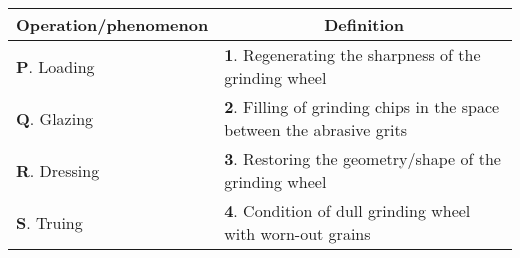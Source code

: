 \begin{center}
\begin{tabular}{|l|l|}
\hline
\multicolumn{1}{|c|}{Operation/phenomenon} & \multicolumn{1}{|c|}{Definition} \\
\hline
\textbf{P}. Loading  & \textbf{1}. Regenerating the sharpness of the grinding wheel \\
\hline
\textbf{Q}. Glazing  & \textbf{2}. Filling of grinding chips in the space between the abrasive grits \\
\hline
\textbf{R}. Dressing & \textbf{3}. Restoring the geometry/shape of the grinding wheel \\
\hline
\textbf{S}. Truing   & \textbf{4}. Condition of dull grinding wheel with worn-out grains \\
\hline
\end{tabular}
\end{center}
